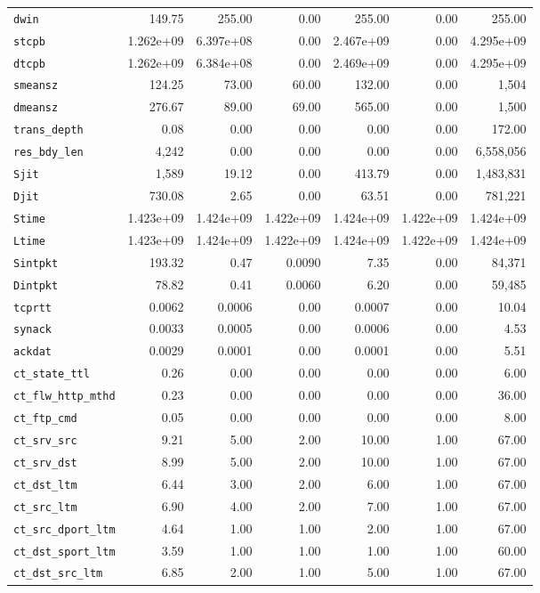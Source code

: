 \documentclass[conference]{IEEEtran}
\begin{document}
\begin{table}[h!]
{\begin{tabular}{lrrrrrr}
\texttt{dwin} & 149.75 & 255.00 & 0.00 & 255.00 & 0.00 & 255.00 \\
\texttt{stcpb} & 1.262e+09 & 6.397e+08 & 0.00 & 2.467e+09 & 0.00 & 4.295e+09 \\
\texttt{dtcpb} & 1.262e+09 & 6.384e+08 & 0.00 & 2.469e+09 & 0.00 & 4.295e+09 \\
\texttt{smeansz} & 124.25 & 73.00 & 60.00 & 132.00 & 0.00 & 1,504 \\
\texttt{dmeansz} & 276.67 & 89.00 & 69.00 & 565.00 & 0.00 & 1,500 \\
\texttt{trans\_depth} & 0.08 & 0.00 & 0.00 & 0.00 & 0.00 & 172.00 \\
\texttt{res\_bdy\_len} & 4,242 & 0.00 & 0.00 & 0.00 & 0.00 & 6,558,056 \\
\texttt{Sjit} & 1,589 & 19.12 & 0.00 & 413.79 & 0.00 & 1,483,831 \\
\texttt{Djit} & 730.08 & 2.65 & 0.00 & 63.51 & 0.00 & 781,221 \\
\texttt{Stime} & 1.423e+09 & 1.424e+09 & 1.422e+09 & 1.424e+09 & 1.422e+09 & 1.424e+09 \\
\texttt{Ltime} & 1.423e+09 & 1.424e+09 & 1.422e+09 & 1.424e+09 & 1.422e+09 & 1.424e+09 \\
\texttt{Sintpkt} & 193.32 & 0.47 & 0.0090 & 7.35 & 0.00 & 84,371 \\
\texttt{Dintpkt} & 78.82 & 0.41 & 0.0060 & 6.20 & 0.00 & 59,485 \\
\texttt{tcprtt} & 0.0062 & 0.0006 & 0.00 & 0.0007 & 0.00 & 10.04 \\
\texttt{synack} & 0.0033 & 0.0005 & 0.00 & 0.0006 & 0.00 & 4.53 \\
\texttt{ackdat} & 0.0029 & 0.0001 & 0.00 & 0.0001 & 0.00 & 5.51 \\
\texttt{ct\_state\_ttl} & 0.26 & 0.00 & 0.00 & 0.00 & 0.00 & 6.00 \\
\texttt{ct\_flw\_http\_mthd} & 0.23 & 0.00 & 0.00 & 0.00 & 0.00 & 36.00 \\
\texttt{ct\_ftp\_cmd} & 0.05 & 0.00 & 0.00 & 0.00 & 0.00 & 8.00 \\
\texttt{ct\_srv\_src} & 9.21 & 5.00 & 2.00 & 10.00 & 1.00 & 67.00 \\
\texttt{ct\_srv\_dst} & 8.99 & 5.00 & 2.00 & 10.00 & 1.00 & 67.00 \\
\texttt{ct\_dst\_ltm} & 6.44 & 3.00 & 2.00 & 6.00 & 1.00 & 67.00 \\
\texttt{ct\_src\_ltm} & 6.90 & 4.00 & 2.00 & 7.00 & 1.00 & 67.00 \\
\texttt{ct\_src\_dport\_ltm} & 4.64 & 1.00 & 1.00 & 2.00 & 1.00 & 67.00 \\
\texttt{ct\_dst\_sport\_ltm} & 3.59 & 1.00 & 1.00 & 1.00 & 1.00 & 60.00 \\
\texttt{ct\_dst\_src\_ltm} & 6.85 & 2.00 & 1.00 & 5.00 & 1.00 & 67.00 \\
\hline
\end{tabular}}
\end{table}
\end{document}
